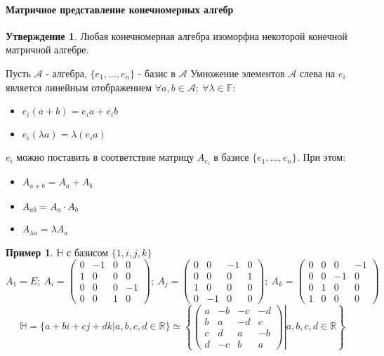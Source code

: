 \documentclass[a4paper, 14pt]{extarticle}
\theoremstyle{definition}
\newtheorem{example}{Пример}
\newtheorem{state}{Утверждение}
\begin{document}
\paragraph{Матричное представление конечномерных алгебр}

\begin{state}
	Любая конечномерная алгебра изоморфна некоторой конечной матричной алгебре.
\end{state}

Пусть \(\mathcal{A}\) - алгебра, \(\{e_1, \dots, e_n\}\) - базис в \(\mathcal{A}\)
Умножение элементов \(\mathcal{A}\) слева на \(e_i\) является линейным отображением \(\forall a, b \in \mathcal{A};\ \forall \lambda \in \mathbb{F}\):
\begin{itemize}
	\item \(e_i(a + b) = e_i a + e_i b\)
	\item \(e_i(\lambda a) = \lambda(e_i a)\)
\end{itemize}
\(e_i\) можно поставить в соответствие матрицу \(A_{e_i}\) в базисе \(\{e_1, \dots, e_n\}\). При этом:

\begin{itemize}
	\item \(A_{a + b} = A_a + A_b\)
	\item \(A_{ab} = A_a \cdot A_b\)
	\item \(A_{\lambda a} = \lambda A_a\)
\end{itemize}

\begin{example}
	\(\mathbb{H}\) с базисом \(\{1, i, j, k\}\)
	\[A_1 = E;\ A_i = \left( 
	\begin{array}{cccc}
	0&-1&0&0\\
	1&0&0&0\\
	0&0&0&-1\\
	0&0&1&0
	\end{array} 
	\right);\ A_j = \left( 
	\begin{array}{cccc}
		0&0&-1&0\\
		0&0&0&1\\
		1&0&0&0\\
		0&-1&0&0
	\end{array} 
	\right);\ A_k = \left( 
	\begin{array}{cccc}
		0&0&0&-1\\
		0&0&-1&0\\
		0&1&0&0\\
		1&0&0&0
	\end{array} 
	\right)\]
	\[\mathbb{H} = \{a + bi + cj + dk | a, b, c, d \in \mathbb{R}\} \simeq \left\{
		\left(
			\left. \begin{array}{cccc}
				a&-b&-c&-d\\
				b&a&-d&c\\
				c&d&a&-b\\
				d&-c&b&a
			\end{array}
		\right) \right| a, b, c, d \in \mathbb{R}
	\right\}\]
\end{example}
\end{document}
